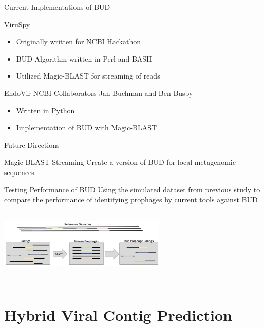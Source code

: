 \documentclass[11pt]{beamer}
\begin{document}
	\begin{frame}{Current Implementations of BUD}
	\begin{block}{ViruSpy}
	\begin{itemize}
	\item Originally written for NCBI Hackathon
	\item BUD Algorithm written in Perl and BASH
	\item Utilized Magic-BLAST for streaming of reads 
	\end{itemize}
	\end{block}
	
	\begin{block}{EndoVir}
	NCBI Collaborators Jan Buchman and Ben Busby \\ 
	\begin{itemize}
	\item Written in Python
	\item Implementation of BUD with Magic-BLAST
	\end{itemize}
	\end{block}
	\end{frame}
	
	\begin{frame}{Future Directions}
	\begin{block}{Magic-BLAST Streaming}
	Create a version of BUD for local metagenomic sequences 
	\end{block}
	
	\begin{block}{Testing Performance of BUD}
	Using the simulated dataset from previous study to compare the performance of identifying prophages by current tools against BUD
	\center
	\includegraphics[height=4cm, width=8cm]{fig.png}
	
	\end{block}
	\end{frame}
	
	
\section{Hybrid Viral Contig Prediction}
\end{document}
